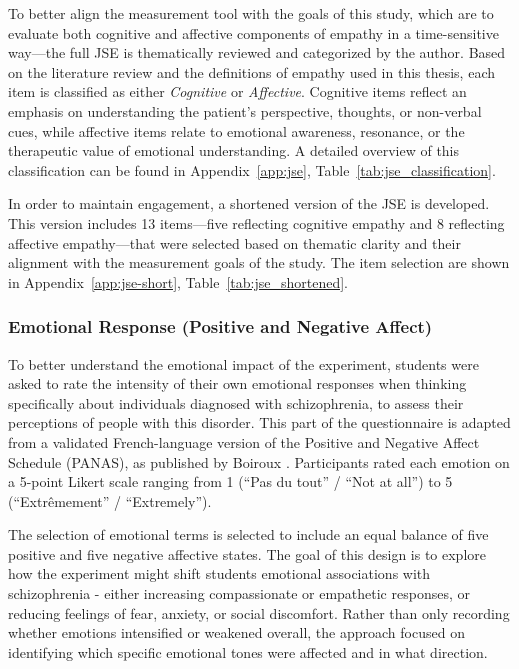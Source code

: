 To better align the measurement tool with the goals of this study, which are to evaluate both cognitive and affective components of empathy in a time-sensitive way—the full JSE is thematically reviewed and categorized by the author. Based on the literature review and the definitions of empathy used in this thesis, each item is classified as either \textit{Cognitive} or \textit{Affective}. Cognitive items reflect an emphasis on understanding the patient’s perspective, thoughts, or non-verbal cues, while affective items relate to emotional awareness, resonance, or the therapeutic value of emotional understanding. A detailed overview of this classification can be found in Appendix~\ref{app:jse}, Table~\ref{tab:jse_classification}.

In order to maintain engagement, a shortened version of the JSE is developed. This version includes 13 items—five reflecting cognitive empathy and 8 reflecting affective empathy—that were selected based on thematic clarity and their alignment with the measurement goals of the study. The item selection are shown in Appendix~\ref{app:jse-short}, Table~\ref{tab:jse_shortened}. %

\subsubsection{Emotional Response (Positive and Negative Affect)}

To better understand the emotional impact of the experiment, students were asked to rate the intensity of their own emotional responses when thinking specifically about individuals diagnosed with schizophrenia, to assess their perceptions of people with this disorder. This part of the questionnaire is adapted from a validated French-language version of the Positive and Negative Affect Schedule (PANAS), as published by Boiroux \cite{Boiroux2024}. Participants rated each emotion on a 5-point Likert scale ranging from 1 (“Pas du tout” / “Not at all”) to 5 (“Extrêmement” / “Extremely”).

\vspace{1em}

The selection of emotional terms is selected to include an equal balance of five positive and five negative affective states. The goal of this design is to explore how the experiment might shift students emotional associations with schizophrenia - either increasing compassionate or empathetic responses, or reducing feelings of fear, anxiety, or social discomfort. Rather than only recording whether emotions intensified or weakened overall, the approach focused on identifying which specific emotional tones were affected and in what direction.

